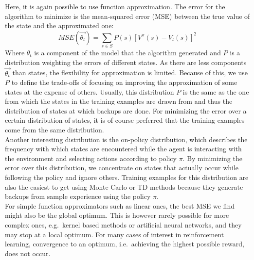 Here, it is again possible to use function approximation.
The error for the algorithm to minimize is the mean-squared error (MSE) between the true value of the state and the approximated one:
\begin{equation}
MSE(\overrightarrow{\theta_t}) = \sum_{s \in S} P(s) \left[ V^{\pi}(s) - V_t(s) \right]^2
\end{equation}
Where $\theta_t$ is a component of the model that the algorithm generated and $P$ is a distribution weighting the errors of different states.
As there are less components $\overrightarrow{\theta_t}$ than states, the flexibility for approximation is limited.
Because of this, we use $P$ to define the trade-offs of focusing on improving the approximation of some states at the expense of others.
Usually, this distribution $P$ is the same as the one from which the states in the training examples are drawn from and thus the distribution of states at which backups are done.
For minimizing the error over a certain distribution of states, it is of course preferred that the training examples come from the same distribution.\\
Another interesting distribution is the on-policy distribution, which describes the frequency with which states are encountered while the agent is interacting with the environment and selecting actions according to policy $\pi$.
By minimizing the error over this distribution, we concentrate on states that actually occur while following the policy and ignore others.
Training examples for this distribution are also the easiest to get using Monte Carlo or TD methods because they generate backups from sample experience using the policy $\pi$.\\
For simple function approximators such as linear ones, the best MSE we find might also be the global optimum.
This is however rarely possible for more complex ones, e.g.\ kernel based methods or artificial neural networks, and they may stop at a local optimum.
For many cases of interest in reinforcement learning, convergence to an optimum, i.e.\ achieving the highest possible reward, does not occur.\\


